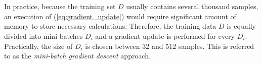 In practice, because the training set $D$ usually contains several thousand samples, an execution of  (\ref{eq:gradient_update}) would require significant amount of memory to store necessary calculations. Therefore, the training data $D$ is equally divided into mini batches  $\widetilde{D}_i$  and a gradient update is  performed for every $\widetilde{D}_i$. Practically,  the size of $\widetilde{D}_i$ is chosen between 32 and 512 samples. This is referred to as the \textit{mini-batch gradient descent} approach.






